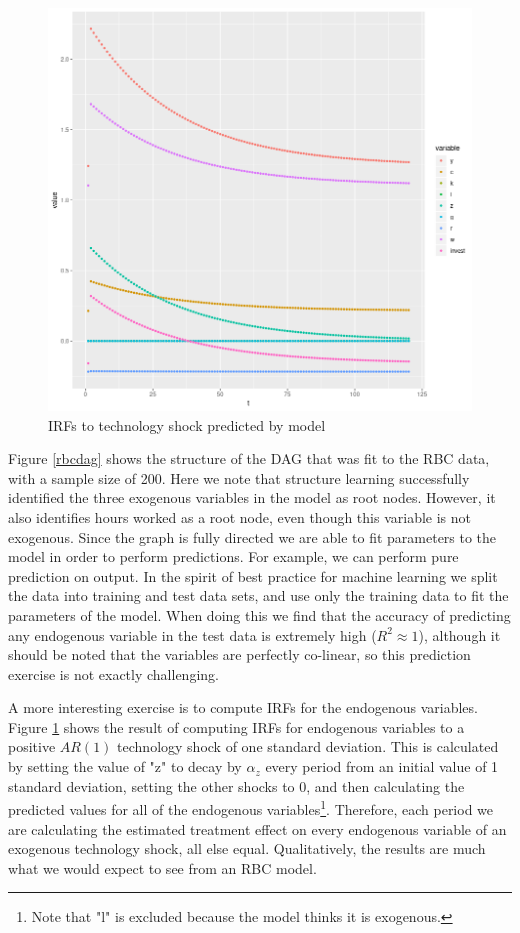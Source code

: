 \documentclass{article}
\begin{document}
\begin{figure}
\centering
\label{rbcirf}
\includegraphics[width=\textwidth, height=0.4\textheight, keepaspectratio]{rbc_irf_ar1.png}
\caption{IRFs to technology shock predicted by model}
\end{figure}

Figure \ref{rbcdag} shows the structure of the DAG that was fit to the RBC data, with a sample size of 200. Here we note that structure learning successfully identified the three exogenous variables in the model as root nodes. However, it also identifies hours worked as a root node, even though this variable is not exogenous. Since the graph is fully directed we are able to fit parameters to the model in order to perform predictions. For example, we can perform pure prediction on output. In the spirit of best practice for machine learning we split the data into training and test data sets, and use only the training data to fit the parameters of the model. When doing this we find that the accuracy of predicting any endogenous variable in the test data is extremely high ($R^2 \approx 1$), although it should be noted that the variables are perfectly co-linear, so this prediction exercise is not exactly challenging. 

A more interesting exercise is to compute IRFs for the endogenous variables. Figure \ref{rbcirf} shows the result of computing IRFs for endogenous variables to a positive $AR(1)$ technology shock of one standard deviation. This is calculated by setting the value of "z" to decay by $\alpha_z$ every period from an initial value of 1 standard deviation, setting the other shocks to 0, and then calculating the predicted values for all of the endogenous variables\footnote{Note that "l" is excluded because the model thinks it is exogenous.}. Therefore, each period we are calculating the estimated treatment effect on every endogenous variable of an exogenous technology shock, all else equal. Qualitatively, the results are much what we would expect to see from an RBC model. 
\end{document}
